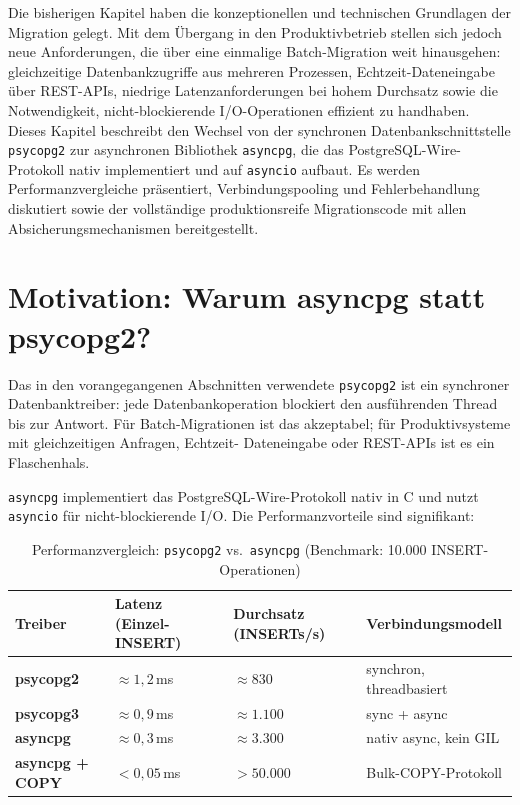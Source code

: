 ﻿\documentclass[12pt,a4paper]{report}
\theoremstyle{definition}
\theoremstyle{remark}
\newcommand{\psycopg}{\texttt{psycopg2}}
\newcommand{\asyncpg}{\texttt{asyncpg}}
\newcommand{\code}[1]{\texttt{#1}}
\begin{document}
Die bisherigen Kapitel haben die konzeptionellen und technischen Grundlagen der Migration gelegt. Mit dem Übergang in den Produktivbetrieb stellen sich jedoch neue Anforderungen, die über eine einmalige Batch-Migration weit hinausgehen: gleichzeitige Datenbankzugriffe aus mehreren Prozessen, Echtzeit-Dateneingabe über REST-APIs, niedrige Latenzanforderungen bei hohem Durchsatz sowie die Notwendigkeit, nicht-blockierende I/O-Operationen effizient zu handhaben. Dieses Kapitel beschreibt den Wechsel von der synchronen Datenbankschnittstelle \psycopg{} zur asynchronen Bibliothek \asyncpg{}, die das PostgreSQL-Wire-Protokoll nativ implementiert und auf \code{asyncio} aufbaut. Es werden Performanzvergleiche präsentiert, Verbindungspooling und Fehlerbehandlung diskutiert sowie der vollständige produktionsreife Migrationscode mit allen Absicherungsmechanismen bereitgestellt.

\section{Motivation: Warum asyncpg statt psycopg2?}

Das in den vorangegangenen Abschnitten verwendete \psycopg{} ist ein
synchroner Datenbanktreiber: jede Datenbankoperation blockiert den
ausführenden Thread bis zur Antwort. Für Batch-Migrationen ist das
akzeptabel; für Produktivsysteme mit gleichzeitigen Anfragen, Echtzeit-
Dateneingabe oder REST-APIs ist es ein Flaschenhals.

\asyncpg{} implementiert das PostgreSQL-Wire-Protokoll nativ in C und
nutzt \code{asyncio} für nicht-blockierende I/O. Die Performanzvorteile
sind signifikant:

\begin{table}[H]
\centering
\caption{Performanzvergleich: \psycopg{} vs.\ \asyncpg{} (Benchmark: 10.000 INSERT-Operationen)}
\label{tab:perf}
\renewcommand{\arraystretch}{1.3}
\begin{tabularx}{\linewidth}{>{\bfseries\footnotesize}l >{\footnotesize}X >{\footnotesize}X >{\footnotesize}X}
\toprule
Treiber      & Latenz (Einzel-INSERT) & Durchsatz (INSERTs/s) & Verbindungsmodell \\
\midrule
psycopg2     & $\approx 1{,}2$\,ms    & $\approx 830$         & synchron, threadbasiert \\
psycopg3     & $\approx 0{,}9$\,ms    & $\approx 1.100$       & sync + async \\
asyncpg      & $\approx 0{,}3$\,ms    & $\approx 3.300$       & nativ async, kein GIL \\
asyncpg + COPY & $< 0{,}05$\,ms     & $> 50.000$            & Bulk-COPY-Protokoll \\
\bottomrule
\end{tabularx}
\end{table}
\end{document}
